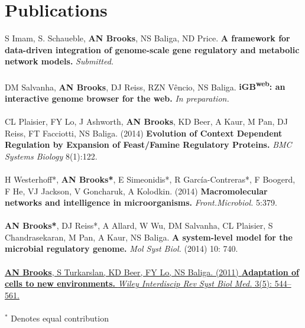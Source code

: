 \documentclass[]{friggeri-cv}
\begin{document}
\section{Publications}
S Imam, S. Schaueble,  \textbf{AN Brooks}, NS Baliga, ND Price. 
\textbf{A framework for data-driven integration of genome-scale gene regulatory and metabolic network models.}
\emph{Submitted.}
\\
\\
DM Salvanha, \textbf{AN Brooks}, DJ Reiss, RZN Vêncio, NS Baliga.
\textbf{iGB\textsuperscript{web}: an interactive genome browser for the web.}
\emph{In preparation.}
\\
\\
CL Plaisier, FY Lo, J Ashworth, \textbf{AN Brooks}, KD Beer, A Kaur, M Pan, DJ Reiss, FT Facciotti, NS Baliga. (2014)
\textbf{Evolution of Context Dependent Regulation by Expansion of Feast/Famine Regulatory Proteins.}
\emph{BMC Systems Biology} 8(1):122.
\\
\\
H Westerhoff*, \textbf{AN Brooks*}, E Simeonidis*, R García-Contreras*, F Boogerd, F He, VJ Jackson, V Goncharuk, A Kolodkin. (2014)
\textbf{Macromolecular networks and intelligence in microorganisms.}
\emph{Front.Microbiol.} 5:379. 
\\
\\
\textbf{AN Brooks*}, DJ Reiss*, A Allard, W Wu, DM Salvanha, CL Plaisier, S Chandrasekaran, M Pan, A Kaur, NS Baliga.
\textbf{A system-level model for the microbial regulatory genome.}
\emph{Mol Syst Biol.} (2014) 10: 740.
\\
\\
\href{http://www.ncbi.nlm.nih.gov/pubmed/21197660}{\noindent
\textbf{AN Brooks}, S Turkarslan, KD Beer, FY Lo, NS Baliga. (2011)
\textbf{Adaptation of cells to new environments.}
\emph{Wiley Interdiscip Rev Syst Biol Med.} 3(5): 544–561.
}
\\
\\
$^{\ast}$ Denotes equal contribution
\end{document}
